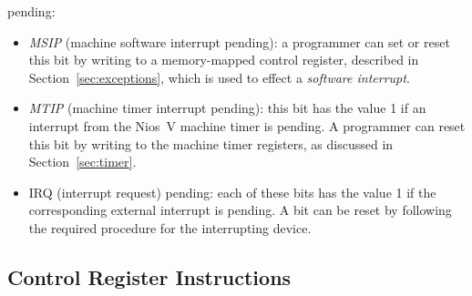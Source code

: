 \documentclass[11pt, twoside, pdftex]{article}
\begin{document}
\begin{itemize}
pending: 
\begin{itemize}
\item {\it MSIP} (machine software interrupt pending): a programmer can set or reset this
bit by writing to a memory-mapped control register, described in Section~\ref{sec:exceptions}, 
which is used to effect a {\it software interrupt}.
\item {\it MTIP} (machine timer interrupt pending): this bit has the value 1 
if an interrupt from the Nios~V machine timer is pending. A programmer can reset this bit 
by writing to the machine timer registers, as discussed in Section~\ref{sec:timer}.
\item IRQ (interrupt request) pending: each of these bits has the value 1 if the
corresponding external interrupt is pending. 
A bit can be reset by following the required procedure for the
interrupting device. 
\end{itemize}
\end{itemize}
 
\subsection{Control Register Instructions}
\label{sec:csr_inst}
\end{document}
